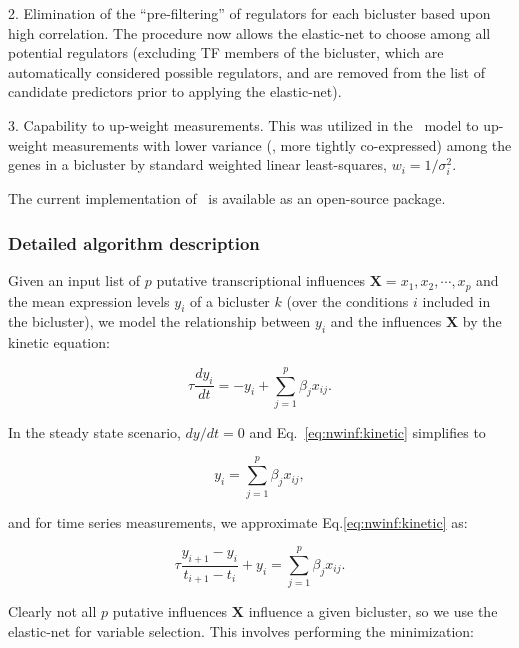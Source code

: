 2. Elimination of the ``pre-filtering'' of regulators for each
bicluster based upon high correlation. The procedure now allows the
elastic-net to choose among all potential regulators (excluding TF
members of the bicluster, which are automatically considered possible
regulators, and are removed from the list of candidate predictors
prior to applying the elastic-net).

3. Capability to up-weight measurements. This was utilized in the
\egrine~model to up-weight measurements with lower variance (\ie,
more tightly co-expressed) among the genes in a bicluster by
standard weighted linear least-squares, $w_i=1/\sigma_i^2$. 

The current implementation of
\nwinf\ is available as
an open-source  package.

\subsubsection{Detailed algorithm description}

Given an input list of $p$ putative transcriptional influences
$\mathbf{X}={x_1,x_2,\cdots,x_p}$ and the mean expression levels $y_{i}$
of a bicluster $k$ (over the conditions $i$ included in the bicluster), we
model the relationship between $y_{i}$ and the influences
$\mathbf{X}$ by the kinetic equation:

\begin{equation}
\label{eq:nwinf:kinetic}
\tau\frac{dy_{i}}{dt}=-y_{i}+\sum_{j=1}^{p}\beta_j x_{ij} .
\end{equation}

\noindent In the steady state scenario, $dy/dt=0$ and Eq.~\ref{eq:nwinf:kinetic} simplifies to

\begin{equation*}
y_{i}=\sum_{j=1}^{p}\beta_j x_{ij} ,
\end{equation*}

\noindent and for time series measurements, we approximate Eq.\ref{eq:nwinf:kinetic} as:

\begin{equation*}
\tau\frac{y_{i+1}-y_{i}}{t_{i+1}-t_i} + y_{i} = \sum_{j=1}^{p}\beta_j x_{ij} .
\end{equation*}

\noindent Clearly not all $p$ putative influences $\mathbf{X}$ influence a given
bicluster, so we use the elastic-net \cite{Zou05regularizationand}
for variable selection. This involves performing the minimization:

